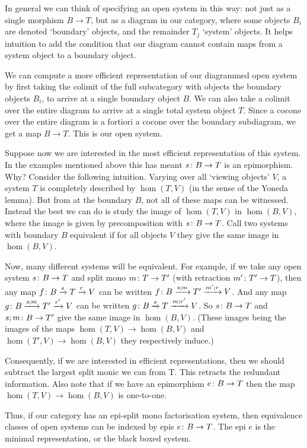In general we can think of specifying an open system in this way: not just as a
single morphism $B \to T$, but as a diagram in our category, where some objects
$B_i$ are denoted `boundary' objects, and the remainder $T_j$ `system' objects. It
helps intuition to add the condition that our diagram cannot contain maps from a
system object to a boundary object.

We can compute a more efficient representation of our diagrammed open system by
first taking the colimit of the full subcategory with objects the boundary
objects $B_i$, to arrive at a single boundary object $B$. We can also take a
colimit over the entire diagram to arrive at a single total system object $T$.
Since a cocone over the entire diagram is a fortiori a cocone over the boundary
subdiagram, we get a map $B \to T$. This is our open system.

Suppose now we are interested in the most efficient representation of this
system. In the examples mentioned above this has meant $s{\colon} B \to T$ is an
epimorphism. Why? Consider the following intuition. Varying over all `viewing
objects' $V$, a system $T$ is completely described by $\hom(T,V)$ (in the sense
of the Yoneda lemma).  But from at the boundary $B$, not all of these maps can
be witnessed. Instead the best we can do is study the image of $\hom(T,V)$ in
$\hom(B,V)$, where the image is given by precomposition with $s{\colon} B \to T$.
Call two systems with boundary $B$ equivalent if for all objects $V$ they give
the same image in $\hom(B,V)$.

Now, many different systems will be equivalent. For example, if we take any open
system $s{\colon} B \to T$ and split mono $m{\colon} T \to T'$ (with retraction
$m'{\colon} T' \to T$), then any map $f{\colon} B \xrightarrow{s} T \xrightarrow{r} V$
can be written $f{\colon} B \xrightarrow{s;m} T' \xrightarrow{m';r} V$.  And any
map $g{\colon} B \xrightarrow{s;m} T' \xrightarrow{r'}V$ can be written $g{\colon} B
\xrightarrow{s} T \xrightarrow{m;r'} V$. So $s{\colon} B \to T$ and $s;m{\colon} B \to
T'$ give the same image in $\hom(B,V)$.  (These images being the images of the
maps $\hom(T,V) \to \hom(B,V)$ and $\hom(T',V) \to \hom(B,V)$ they respectively
induce.)

Consequently, if we are interested in efficient representations, then we should
subtract the largest split monic we can from T. This retracts the redundant
information. Also note that if we have an epimorphism $e{\colon} B \to T$ then the
map $\hom(T,V) \to \hom(B,V)$ is one-to-one.

Thus, if our category has an epi-split mono factorisation system, then
equivalence classes of open systems can be indexed by epis $e{\colon} B \to T$. The
epi $e$ is the minimal representation, or the black boxed system.

